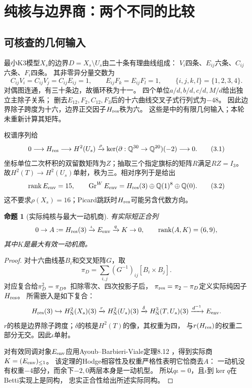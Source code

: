 \documentclass[11pt,a4paper]{ctexart}
\theoremstyle{cnplain}\newtheorem{theorem}{定理}[section]
\newtheorem{proposition}[theorem]{命题}
\theoremstyle{remark}\newtheorem{remark}[theorem]{注}
\newcommand{\Q}{\mathbb Q}\newcommand{\C}{\mathbb C}\newcommand{\Z}{\mathbb Z}
\newcommand{\Nori}{\mathrm N}\newcommand{\im}{\operatorname{im}}
\begin{document}
\section{纯核与边界商：两个不同的比较}
\subsection{可核查的几何输入}
最小K3模型$X_s$的边界$D=X_s\setminus U_s$由二十条有理曲线组成：
$V_i$四条、$E_{ij}$六条、$C_{ij}$六条、$F_i$四条。
其非零异分量交数为
\[
 C_{ij}V_i=C_{ij}V_j=C_{ij}E_{ij}=1,\qquad
 E_{ij}F_k=E_{ij}F_l=1,\qquad\{i,j,k,l\}=\{1,2,3,4\}.
\]
对偶图连通，有三十条边，故循环秩为十一。
四个单位$a/d,b/d,c/d,M/d$给出独立主除子关系；
删去$E_{12},F_2,C_{12},F_3$后的十六曲线交叉子式行列式为$-48$。
因此边界除子跨度为十六，边界正交因子$H_{\rm res}$秩为六。
这些是\cite{Hodge,Kernel}中的有限几何输入；本轮未重新计算其矩阵。

权谱序列给
\[
 0\longrightarrow H_{\rm res}\longrightarrow H^2(U_s)
 \xrightarrow{\rho}\ker(\partial:\Q^{30}\to\Q^{20})(-2)
 \longrightarrow0.                                             \tag{3.1}
\]
坐标单位二次杯积的双留数矩阵为$Z$；抽取三个指定旗标的矩阵$R$满足$RZ=I_3$。
故$H^2(T)\to H^2(U_s)$单射，秩为三。相对序列于是给出
\[
 \rk E_{\rm env}=15,\qquad
 \operatorname{Gr}^W E_{\rm env}
 =H_{\rm res}(3)\oplus\Q(1)^8\oplus\Q(0).                        \tag{3.2}
\]
这不要求$\rho(X_s)=16$；Picard跳跃时$H_{\rm res}$可能另含代数方向。

\begin{proposition}[实际纯核与最大一动机商]\label{prop:kernel}
有实际短正合列
\[
 0\to A:=H_{\rm res}(3)\xrightarrow{\iota}E_{\rm env}
 \xrightarrow{q}K\to0,\qquad \operatorname{rank}(A,K)=(6,9),
\]
其中$K$是最大有效一动机商。
\end{proposition}
\begin{proof}
对十六曲线基$B_i$和交叉矩阵$G$，取
\[
 \pi_D=\sum_{i,j}(G^{-1})_{ij}[B_i\times B_j].
\]
对应复合给$\pi_D^2=\pi_D$。扣除零次、四次投影子后，
$\pi_{\rm res}=\pi_2-\pi_D$定义实际纯因子$H_{\rm res}$。
所需嵌入是如下复合：
\[
 H_{\rm res}(3)\hookrightarrow H^2_\Nori(X_s)(3)
 \xrightarrow{r}H^2_\Nori(U_s)(3)
 \xrightarrow{\delta}H^3_\Nori(T,U_s)(3)\xrightarrow{d^{-1}}E_{\rm env}.
\]
$r$的核是边界除子跨度；$\delta$的核是$H^2(T)$的像，其权重为四，
与$r(H_{\rm res})$的权重二部分无交。因此$\iota$单射。

对有效同调对象$E_{\rm env}$应用Ayoub--Barbieri-Viale定理8.12
\cite{ABV}，得到实际商$K=(E_{\rm env})_{\leq1}$。
该定理的Hodge相容性及权重严格性表明它恰商去$A$：
一动机没有权重$-4$部分，而余下$-2,0$两层本身是一动机型。
所以$q\iota=0$，且$\iota$到$\ker q$在Betti实现上是同构，
忠实正合性给出所述实际同构。
\end{proof}
\end{document}
